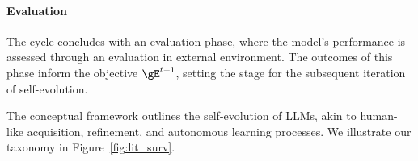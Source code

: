 \documentclass[sn-basic, Numbered]{sn-jnl}%
\theoremstyle{thmstyleone}%
\theoremstyle{thmstyletwo}%
\theoremstyle{thmstylethree}%
\begin{document}
\noindent\paragraph{Evaluation}
The cycle concludes with an evaluation phase, where the model's performance is assessed through an evaluation in external environment. The outcomes of this phase inform the objective $\gE^{t+1}$, setting the stage for the subsequent iteration of self-evolution.

The conceptual framework outlines the self-evolution of LLMs, akin to human-like acquisition, refinement, and autonomous learning processes. We illustrate our taxonomy in Figure~\ref{fig:lit_surv}.
\end{document}
